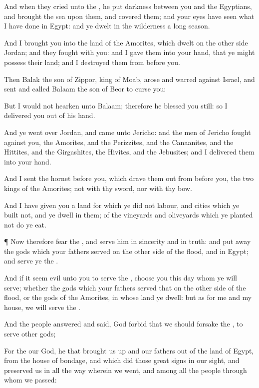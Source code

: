 {And when they
cried unto the
{}, he
put
darkness between you and the
Egyptians, and
brought the
sea upon them, and
covered them; and your
eyes have
seen what I have
done in
Egypt: and ye
dwelt in the
wilderness a
long
season.

And I
brought you into the
land of the
Amorites, which
dwelt on the other
side
Jordan; and they
fought with you: and I
gave them into your
hand, that ye might
possess their
land; and I
destroyed them from
before you.

Then
Balak the
son of
Zippor,
king of
Moab,
arose and
warred against
Israel, and
sent and
called
Balaam the
son of
Beor to
curse you:

But I
would not
hearken unto
Balaam; therefore he
blessed you
still: so I
delivered you out of his
hand.

And ye went
over
Jordan, and
came unto
Jericho: and the
men of
Jericho
fought against you, the
Amorites, and the
Perizzites, and the
Canaanites, and the
Hittites, and the
Girgashites, the
Hivites, and the
Jebusites; and I
delivered them into your
hand.

And I
sent the
hornet
before you, which drave them
out from
before you,
{} the
two
kings of the
Amorites;
{} not with thy
sword, nor with thy
bow.

And I have
given you a
land for which ye did not
labour, and
cities which ye
built not, and ye
dwell in them; of the
vineyards and
oliveyards which ye
planted not do ye
eat.


\par }{\PP {}¶ Now therefore
fear the
{}, and
serve him in
sincerity and in
truth: and put
away the
gods which your
fathers
served on the other
side of the
flood, and in
Egypt; and
serve ye the
{}.


\par }{\PP {}And if it seem
evil unto
you to
serve the
{},
choose you this
day
whom ye will
serve; whether the
gods which your
fathers
served that
{} on the other
side of the
flood, or the
gods of the
Amorites, in whose
land ye
dwell: but as for me and my
house, we will
serve the
{}.

And the
people
answered and
said, God
forbid that we should
forsake the
{}, to
serve
other
gods;

For the
{} our
God, he
{} that brought us
up and our
fathers out of the
land of
Egypt, from the
house of
bondage, and which
did those
great
signs in our
sight, and
preserved us in all the
way wherein we
went, and among all the
people
through whom we
passed:

}

